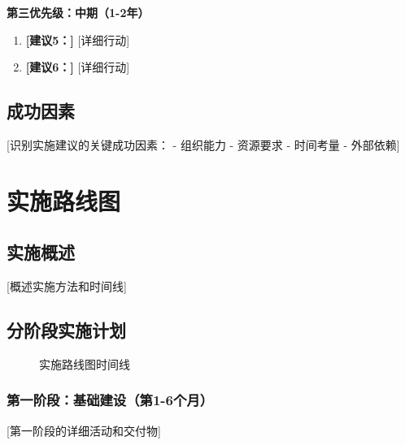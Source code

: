 \documentclass[11pt,letterpaper]{report}
\begin{document}
{\begin{recommendationbox}[战略建议]
\textbf{第三优先级：中期（1-2年）}
\begin{enumerate}[start=5]
    \item \textbf{[建议5：]} [详细行动]
    \item \textbf{[建议6：]} [详细行动]
\end{enumerate}
\end{recommendationbox}

\section{成功因素}

[识别实施建议的关键成功因素：
- 组织能力
- 资源要求
- 时间考量
- 外部依赖]

\chapter{实施路线图}

\section{实施概述}

[概述实施方法和时间线]

\section{分阶段实施计划}


\begin{figure}[htbp]
\centering
\caption{实施路线图时间线}
\label{fig:implementation}
\end{figure}

\subsection{第一阶段：基础建设（第1-6个月）}
[第一阶段的详细活动和交付物]

}
\end{document}
